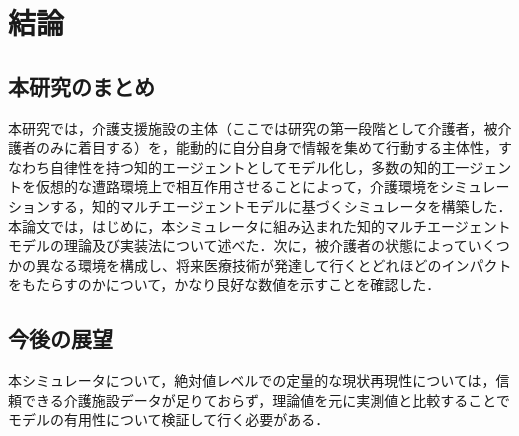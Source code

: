 \chapter{結論}

\section{本研究のまとめ}

本研究では，介護支援施設の主体（ここでは研究の第一段階として介護者，被介護者のみに着目する）を，能動的に自分自身で情報を集めて行動する主体性，すなわち自律性を持つ知的エージェントとしてモデル化し，多数の知的工一ジェントを仮想的な遭路環境上で相互作用させることによって，介護環境をシミュレーションする，知的マルチエージェントモデルに基づくシミュレータを構築した．本論文では，はじめに，本シミュレータに組み込まれた知的マルチエージェントモデルの理論及び実装法について述べた．次に，被介護者の状態によっていくつかの異なる環境を構成し、将来医療技術が発達して行くとどれほどのインパクトをもたらすのかについて，かなり艮好な数値を示すことを確認した．

\section{今後の展望}
本シミュレータについて，絶対値レベルでの定量的な現状再現性については，信頼できる介護施設データが足りておらず，理論値を元に実測値と比較することでモデルの有用性について検証して行く必要がある．

